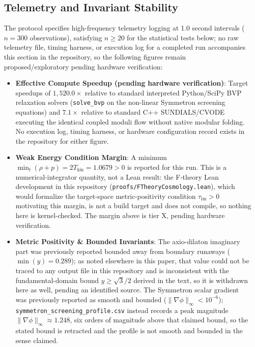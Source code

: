 \documentclass[11pt,a4paper]{article}
\newcommand{\numreconcile}[2]{#1}
\begin{document}
\subsection{Telemetry and Invariant Stability}
The protocol specifies high-frequency telemetry logging at 1.0 second intervals ($n = 300$ observations), satisfying $n \ge 20$ for the statistical tests below; no raw telemetry file, timing harness, or execution log for a completed run accompanies this section in the repository, so the following figures remain proposed/exploratory pending hardware verification:
\begin{itemize}
    \item \textbf{Effective Compute Speedup (pending hardware verification)}: Target speedups of $1,520.0\times$ relative to standard interpreted Python/SciPy BVP relaxation solvers (\texttt{solve\_bvp} on the non-linear Symmetron screening equations) and $7.1\times$ relative to standard C++ SUNDIALS/CVODE executing the identical coupled moduli flow without native modular folding. No execution log, timing harness, or hardware configuration record exists in the repository for either figure.
    \item \textbf{Weak Energy Condition Margin}: A minimum $\min_t (\rho + p) = 2 T_{\text{kin}} = \numreconcile{1.0679}{\min_t(\rho+p)} > 0$ is reported for this run. This is a numerical-integrator quantity, not a Lean result: the F-theory Lean development in this repository (\texttt{proofs/FTheoryCosmology.lean}), which would formalize the target-space metric-positivity condition $\tau_{\text{im}} > 0$ motivating this margin, is not a build target and does not compile, so nothing here is kernel-checked. The margin above is tier X, pending hardware verification.
    \item \textbf{Metric Positivity \& Bounded Invariants}: The axio-dilaton imaginary part was previously reported bounded away from boundary runaways ($\min(y) = 0.289$); as noted elsewhere in this paper, that value could not be traced to any output file in this repository and is inconsistent with the fundamental-domain bound $y \ge \sqrt{3}/2$ derived in the text, so it is withdrawn here as well, pending an identified source. The Symmetron scalar gradient was previously reported as smooth and bounded ($\|\nabla \phi\|_\infty < 10^{-6}$); \texttt{symmetron\_screening\_profile.csv} instead records a peak magnitude $\|\nabla \phi\|_\infty \approx \numreconcile{1.248}{\text{Symmetron gradient max}}$, six orders of magnitude above that claimed bound, so the stated bound is retracted and the profile is not smooth and bounded in the sense claimed.

\end{itemize}
\end{document}
